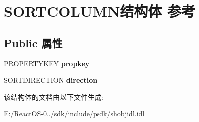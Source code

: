 \hypertarget{struct_s_o_r_t_c_o_l_u_m_n}{}\section{S\+O\+R\+T\+C\+O\+L\+U\+M\+N结构体 参考}
\label{struct_s_o_r_t_c_o_l_u_m_n}
\subsection*{Public 属性}
\begin{DoxyCompactItemize}
\item 
\mbox{\label{struct_s_o_r_t_c_o_l_u_m_n_a0cd71e9243e25fd13d43c624fdc2eded}} 
P\+R\+O\+P\+E\+R\+T\+Y\+K\+EY {\bfseries propkey}
\item 
\mbox{\label{struct_s_o_r_t_c_o_l_u_m_n_a269f8c8aaf3603cd4ef427f9039f1940}} 
S\+O\+R\+T\+D\+I\+R\+E\+C\+T\+I\+ON {\bfseries direction}
\end{DoxyCompactItemize}


该结构体的文档由以下文件生成\+:\begin{DoxyCompactItemize}
\item 
E\+:/\+React\+O\+S-\/0../sdk/include/psdk/shobjidl.\+idl\end{DoxyCompactItemize}
